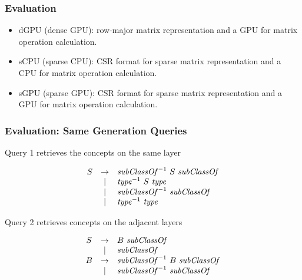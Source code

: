 \documentclass[xcolor=table]{beamer}
\begin{document}
\begin{frame}
  \transwipe[direction=90]
  \frametitle{Evaluation}

\begin{itemize}
    \item dGPU (dense GPU): row-major matrix representation and a GPU for matrix operation calculation. 
    \item sCPU (sparse CPU): CSR format for sparse matrix representation and a CPU for matrix operation calculation. 
    \item sGPU (sparse GPU): CSR format for sparse matrix representation and a GPU for matrix operation calculation.
\end{itemize}


\end{frame}
       
            
\begin{frame}
  \transwipe[direction=90]
  \frametitle{Evaluation: Same Generation Queries}
Query 1 retrieves the concepts on the same layer

\begin{figure}[h]
   \[
\begin{array}{ccl}
   S & \rightarrow & \text{\emph{subClassOf}}^{-1} \ S \ \text{\emph{subClassOf}} \\ 
     & |           & \text{\emph{type}}^{-1} \ S \ \text{\emph{type}} \\ 
     & |           & \text{\emph{subClassOf}}^{-1} \ \text{\emph{subClassOf}} \\ 
     & |           & \text{\emph{type}}^{-1} \ \text{\emph{type}} \\ 
\end{array}
\]

\end{figure}

Query 2 retrieves concepts on the adjacent layers

\begin{figure}[h]
   \[
\begin{array}{ccl}
   S & \rightarrow & B \ \text{\emph{subClassOf}} \\ 
     & |           & \text{\emph{subClassOf}} \\ 
   B & \rightarrow & \text{\emph{subClassOf}}^{-1} \ B \ \text{\emph{subClassOf}} \\ 
     & |           & \text{\emph{subClassOf}}^{-1} \ \text{\emph{subClassOf}} \\ 
\end{array}
\]
\end{figure}

\end{frame}
            
\end{document}
